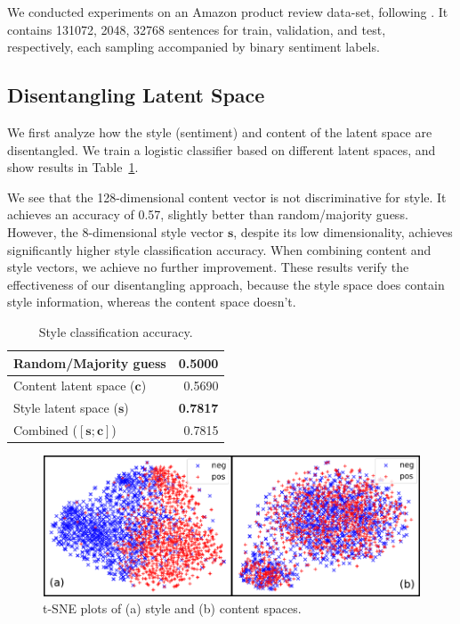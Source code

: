 We conducted experiments on an Amazon product review data-set, following \cite{fu2017style}. It contains 131072, 2048, 32768 sentences for train, validation, and test, respectively, each sampling accompanied by binary sentiment labels.

\subsection{Disentangling Latent Space}

We first analyze how the style (sentiment) and content of the latent space are disentangled. We train a logistic classifier based on different latent spaces, and show results in Table~\ref{tab:classification}.

We see that the 128-dimensional content vector is not discriminative for style. It achieves an accuracy of 0.57, slightly better than random/majority guess. However, the 8-dimensional style vector $\bm s$, despite its low dimensionality, achieves significantly higher style classification accuracy. When combining content and style vectors, we achieve no further improvement. These results verify the effectiveness of our disentangling approach, because the style space does contain style information, whereas the content space doesn't.


\begin{table}
	\centering
	\begin{tabular}{| l | r |}
		\hline
		Random/Majority guess           & 0.5000          \\ \hline
		Content latent space  ($\bm c$) & 0.5690          \\
		Style latent space ($\bm s$)    & \textbf{0.7817} \\
		Combined ($[\bm s;\bm c]$)      & 0.7815          \\
		\hline
	\end{tabular}
	\caption{Style classification accuracy.}
	\label{tab:classification}
\end{table}

\begin{figure}
	\includegraphics[width=\linewidth]{images/tsne-style-and-content}
	\caption{t-SNE plots of (a) style and (b) content spaces.}
	\label{fig:tsne}
\end{figure}


